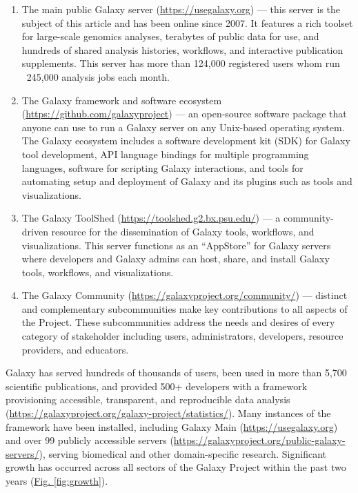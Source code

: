 \begin{enumerate}
\item The main public Galaxy server (\url{https://usegalaxy.org}) — this server is the subject of this article and has been online since 2007. It features a rich toolset for large-scale genomics analyses, terabytes of public data for use, and hundreds of shared analysis histories, workflows, and interactive publication supplements. This server has more than 124,000 registered users whom run ~245,000 analysis jobs each month.

\item The Galaxy framework and software ecosystem (\url{https://github.com/galaxyproject}) — an open-source software package that anyone can use to run a Galaxy server on any Unix-based operating system. The Galaxy ecosystem includes a software development kit (SDK) for Galaxy tool development, API language bindings for multiple programming languages, software for scripting Galaxy interactions, and tools for automating setup and deployment of Galaxy and its plugins such as tools and visualizations.

\item The Galaxy ToolShed (\url{https://toolshed.g2.bx.psu.edu/}) — a community-driven resource for the dissemination of Galaxy tools, workflows, and visualizations. This server functions as an “AppStore” for Galaxy servers where developers and Galaxy admins can host, share, and install Galaxy tools, workflows, and visualizations.

\item The Galaxy Community (\url{https://galaxyproject.org/community/}) — distinct and complementary subcommunities make key contributions to all aspects of the Project. These subcommunities address the needs and desires of every category of stakeholder including users, administrators, developers, resource providers, and educators.
\end{enumerate}

Galaxy has served hundreds of thousands of users, been used in more than 5,700 scientific publications, and provided 500+ developers with a framework provisioning accessible, transparent, and reproducible data analysis (\url{https://galaxyproject.org/galaxy-project/statistics/}). Many instances of the framework have been installed, including Galaxy Main (\url{https://usegalaxy.org}) and over 99 publicly accessible servers (\url{https://galaxyproject.org/public-galaxy-servers/}), serving biomedical and other domain-specific research. Significant growth has occurred across all sectors of the Galaxy Project within the past two years (\hyperref[fig:growth]{Fig. \ref{fig:growth}}).


